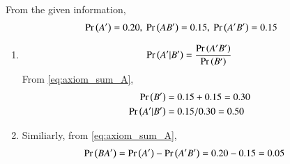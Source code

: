 From the  given information,
 \begin{align}
 \Pr\left(A^\prime\right) = 0.20,\   	
\Pr\left(AB^ \prime\right)=0.15,\ 	
\Pr\left(A ^\prime B ^\prime\right)=0.15
 \end{align} 
\begin{enumerate}
\item 
\begin{align}
 \pr{A ^\prime|B ^\prime}=\frac{\pr{ A ^\prime B ^\prime }}{\pr{B^\prime}} \label{eq:ncert/12/13/6/15/dot}
\end{align}
From 
\eqref{eq:axiom_sum_A},
\begin{align}
	\Pr\left(B^ \prime\right)&=
          0.15 +0.15 
=0.30 
\\
	\Pr\left(A^\prime|B ^\prime\right)&= 0.15/0.30 
 = 0.50
\end{align}
\item 
Similiarly, 
from 
\eqref{eq:axiom_sum_A},
\begin{align}
\Pr\left(B  A ^\prime\right)&=\Pr\left(A^\prime\right)-\Pr\left(A ^\prime B ^\prime\right) 
 = 0.20-0.15  = 0.05
\end{align}
\end{enumerate}

